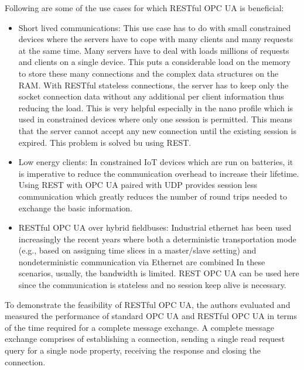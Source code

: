 \documentclass[conference]{IEEEtran}
\begin{document}
Following are some of the use cases for which RESTful OPC UA is beneficial:

\begin{itemize}
\item Short lived communications: This use case has to do with small constrained devices where the servers have to cope with many clients and many requests at the same time. Many servers have to deal with loads millions of requests and clients on a single device. This puts a considerable load on the memory to store these many connections and the complex data structures on the RAM. With RESTful stateless connections, the server has to keep only the socket connection data without any additional per client information thus reducing the load. This is very helpful especially in the nano profile which is used in constrained devices where only one session is permitted. This means that the server cannot accept any new connection until the existing session is expired. This problem is solved bu using REST.\cite{gruner2016restful}

\item Low energy clients: In constrained IoT devices which are run on batteries, it is imperative to reduce the communication overhead to increase their lifetime. Using REST with OPC UA paired with UDP provides session less communication which greatly reduces the number of round trips needed to exchange the basic information. 

\item RESTful OPC UA over hybrid fieldbuses: Industrial ethernet has been used increasingly the recent years where both a deterministic transportation mode (e.g., based on assigning time slices in a master/slave setting) and nondeterministic communication via Ethernet are combined\cite{gruner2016restful}
In these scenarios, usually, the bandwidth is limited. REST OPC UA can be used here since the communication is stateless and no session keep alive is necessary.

\end{itemize}

To demonstrate the feasibility of RESTful OPC UA, the authors evaluated and measured the performance of standard OPC UA and RESTful OPC UA in terms of the time required for a complete message exchange. A complete message exchange comprises of establishing a connection, sending a single read request query for a single node property, receiving the response and closing the connection.
\end{document}
